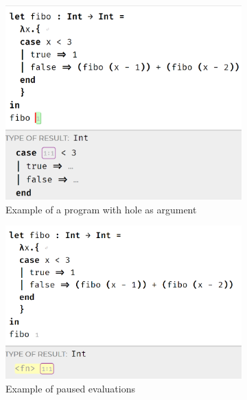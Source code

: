 \begin{figure}[htbp]
  \centering
  \begin{subfigure}[b]{0.3\textwidth}
      \centering
      \includegraphics[width=\textwidth]{img/pause_fibo.png}
      \caption{Example of a program with hole as argument}
      \label{fig:pause1}
  \end{subfigure}
  \hfill
  \begin{subfigure}[b]{0.3\textwidth}
    \centering
    \includegraphics[width=\textwidth]{img/pause_fibo2.png}
    \caption{Example of paused evaluations}
    \label{fig:pause2}
  \end{subfigure}
  \hfill
  \begin{subfigure}[b]{0.3\textwidth}
      \centering

\end{subfigure}
\end{figure}
